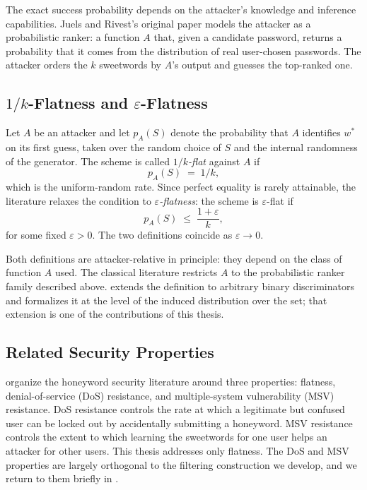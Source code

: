 The exact success probability depends on the attacker's knowledge and
inference capabilities. Juels and Rivest's original paper models the
attacker as a probabilistic ranker: a function $A$ that, given a
candidate password, returns a probability that it comes from the
distribution of real user-chosen passwords. The attacker orders the
$k$ sweetwords by $A$'s output and guesses the top-ranked one.

\subsection{$1/k$-Flatness and $\varepsilon$-Flatness}

Let $A$ be an attacker and let $p_A(S)$ denote the probability that
$A$ identifies $w^{*}$ on its first guess, taken over the random
choice of $S$ and the internal randomness of the generator. The scheme
is called \emph{$1/k$-flat} against $A$ if
%
\begin{equation}
p_A(S) \;=\; 1/k,
\end{equation}
%
which is the uniform-random rate. Since perfect equality is rarely
attainable, the literature relaxes the condition to
\emph{$\varepsilon$-flatness}: the scheme is $\varepsilon$-flat if
%
\begin{equation}
p_A(S) \;\le\; \frac{1 + \varepsilon}{k},
\end{equation}
%
for some fixed $\varepsilon > 0$. The two definitions coincide as
$\varepsilon \to 0$.

Both definitions are attacker-relative in principle: they depend on
the class of function $A$ used. The classical literature restricts $A$
to the probabilistic ranker family described above. 
extends the definition to arbitrary binary discriminators and
formalizes it at the level of the induced distribution over the set;
that extension is one of the contributions of this thesis.

\subsection{Related Security Properties}

\textcite{chakraborty2022hbat} organize the honeyword security
literature around three properties: flatness, denial-of-service (DoS)
resistance, and multiple-system vulnerability (MSV) resistance. DoS
resistance controls the rate at which a legitimate but confused user
can be locked out by accidentally submitting a honeyword. MSV
resistance controls the extent to which learning the sweetwords for
one user helps an attacker for other users. This thesis addresses only
flatness. The DoS and MSV properties are largely orthogonal to the
filtering construction we develop, and we return to them briefly in
.

